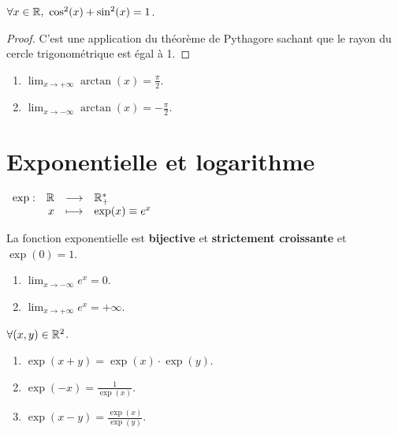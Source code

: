 \begin{proposition}
    $\forall x \in \mathbb{R},\ \cos^2(x) + \sin^2(x) = 1$.
\end{proposition}

\begin{proof}
    C'est une application du théorème de Pythagore sachant que le rayon du cercle trigonométrique est égal à 1.
\end{proof}

\begin{proposition}
	
    \begin{enumerate}
        \item $\lim_{x \to +\infty} \arctan(x) = \frac{\pi}{2}$.
        \item $\lim_{x \to -\infty} \arctan(x) = -\frac{\pi}{2}$.
    \end{enumerate}
\end{proposition}

\section{Exponentielle et logarithme}

\begin{definition}
	\begin{center}
		$
		\begin{array}{rrcl} \exp : & \mathbb{R} & \longrightarrow & \mathbb{R}_+^* \\ & x & \longmapsto & \exp(x) \equiv e^x \end{array}
		$
	\end{center}
\end{definition}

\begin{proposition}
	La fonction exponentielle est \textbf{bijective} et \textbf{strictement croissante} et $\exp(0) = 1$.
    \begin{enumerate}
            \item $\lim_{x \to -\infty} e^x = 0$.
            \item $\lim_{x \to +\infty} e^x = +\infty$.
        \end{enumerate}
    \noindent $\forall (x, y) \in \mathbb{R}^2$.
    \begin{enumerate}
            \item $\exp(x + y) = \exp(x) \cdot \exp(y)$.
            \item $\exp(-x) = \frac{1}{\exp(x)}$.
            \item $\exp(x - y) = \frac{\exp(x)}{\exp(y)}$.
        \end{enumerate}
\end{proposition}

